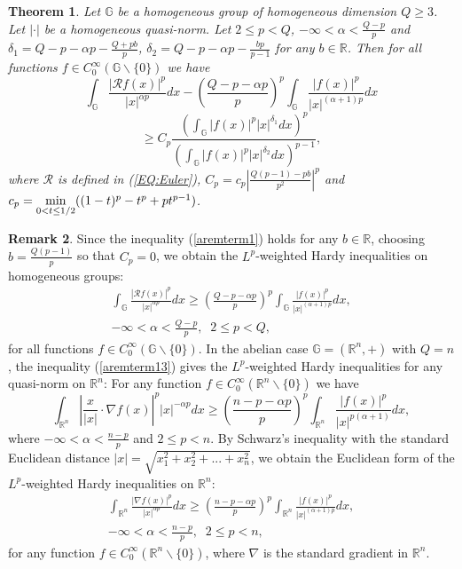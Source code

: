 \documentclass[a4paper,12pt,reqno]{amsart}
\renewcommand\eqref[1]{(\ref{#1})} %
\numberwithin{equation}{section}
\theoremstyle{plain}
\newtheorem{thm}{Theorem}[section]
\theoremstyle{definition}
\newtheorem{rem}[thm]{Remark}
\newcommand{\Rn}{\mathbb R^{n}}
\begin{document}
\begin{thm}\label{aremterm}
Let $\mathbb{G}$ be a homogeneous group
of homogeneous dimension $Q\geq3$. Let $|\cdot|$ be a homogeneous quasi-norm. Let $2\leq p<Q$, $-\infty<\alpha<\frac{Q-p}{p}$ and $\delta_{1}=Q-p-\alpha p-\frac{Q+pb}{p}$, $\delta_{2}=Q-p-\alpha p-\frac{bp}{p-1}$ for any $b\in\mathbb{R}$. Then
for all functions $f\in C_{0}^{\infty}(\mathbb{G}\backslash\{0\})$ we have
$$\int_{\mathbb{G}}\frac{|\mathcal{R}f(x)|^{p}}{|x|^{\alpha p}}dx-\left(\frac{Q-p-\alpha p}{p}\right)^{p}\int_{\mathbb{G}}\frac{|f(x)|^{p}}{|x|^{(\alpha+1)p}}dx$$
\begin{equation}\label{aremterm1}
\geq C_{p} \frac{\left(\int_{\mathbb{G}}|f(x)|^{p}|x|^{\delta_{1}}dx\right)^{p}}
{\left(\int_{\mathbb{G}}|f(x)|^{p}|x|^{\delta_{2}}dx\right)^{p-1}},
\end{equation}
where $\mathcal{R}$ is defined in \eqref{EQ:Euler}, $C_{p}=c_{p}
\left|\frac{Q(p-1)-pb}{p^{2}}\right|^{p}$ and $c_{p}=\underset{0<t\leq1/2}{\rm min}((1-t)^{p}-t^{p}+pt^{p-1})$.
\end{thm}
\begin{rem}\label{aremterm_rem1} Since the inequality \eqref{aremterm1} holds for any $b\in\mathbb{R}$, choosing $b=\frac{Q(p-1)}{p}$ so that $C_{p}=0$, we obtain the $L^{p}$-weighted Hardy inequalities on homogeneous groups:
\begin{multline}\label{aremterm13}
\int_{\mathbb{G}}\frac{|\mathcal{R}f(x)|^{p}}{|x|^{\alpha p}}dx\geq\left(\frac{Q-p-\alpha p}{p}\right)^{p}\int_{\mathbb{G}}\frac{|f(x)|^{p}}{|x|^{(\alpha+1)p}}dx, \\
-\infty<\alpha<\frac{Q-p}{p},\;\; 2\leq p<Q,
\end{multline}
for all functions $f\in C_{0}^{\infty}(\mathbb{G}\backslash\{0\})$.
In the abelian case $\mathbb{G}=(\Rn,+)$ with $Q=n$, the inequality \eqref{aremterm13} gives the $L^{p}$-weighted Hardy inequalities for any quasi-norm on $\Rn$: For any function $f\in C_{0}^{\infty}(\Rn\backslash\{0\})$ we have
$$\int_{\Rn}\left|\frac{x}{|x|}\cdot\nabla f(x)\right|^{p}|x|^{-\alpha p}dx\geq\left(\frac{n-p-\alpha p}{p}\right)^{p}\int_{\Rn}\frac{|f(x)|^{p}}{|x|^{p(\alpha+1)}}dx,$$
where $-\infty<\alpha<\frac{n-p}{p}$ and $2\leq p<n$. By Schwarz's inequality with the standard Euclidean distance $|x|=\sqrt{x_{1}^{2}+x_{2}^{2}+...+x_{n}^{2}}$, we obtain the Euclidean form of the $L^{p}$-weighted Hardy inequalities on $\Rn$:
\begin{multline*}
\int_{\Rn}\frac{|\nabla f(x)|^{p}}{|x|^{\alpha p}}dx\geq\left(\frac{n-p-\alpha p}{p}\right)^{p}\int_{\Rn}\frac{|f(x)|^{p}}{|x|^{(\alpha+1)p}}dx, \\ -\infty<\alpha<\frac{n-p}{p},\;\; 2\leq p<n,
\end{multline*}
for any function $f\in C_{0}^{\infty}(\Rn\backslash\{0\})$, where $\nabla$ is the standard gradient in $\Rn$.
\end{rem}
\end{document}
